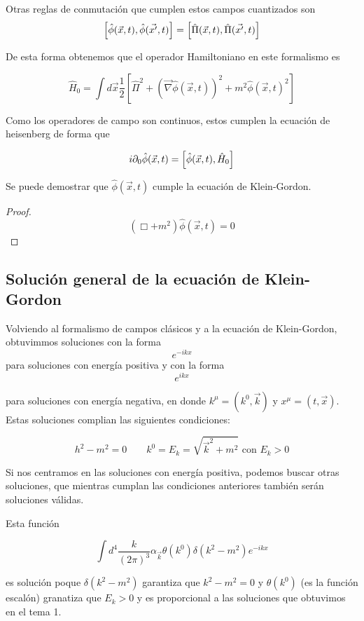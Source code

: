 Otras reglas de conmutación que cumplen estos campos cuantizados son 
\[\comm{\hat{\phi}(\vec{x},t)}{\hat{\phi}(\vec{x'},t)}=\comm{\hat{\Pi}(\vec{x},t)}{\hat{\Pi}(\vec{x'},t)}\]

De esta forma obtenemos que el operador Hamiltoniano en este formalismo es 

\[\hat{H}_{0}=\int d \vec{x}\frac{1}{2}\left[\hat{\Pi}^{2}+(\vec{\nabla}\hat{\phi}(\vec{x},t))^{2}+m^{2}\hat{\phi}(\vec{x},t)^{2}\right]\]

Como los operadores de campo son continuos, estos cumplen la ecuación de heisenberg de forma que 

\[i\partial_{0}\hat{\phi}(\vec{x},t)=\comm{\hat{\phi}(\vec{x},t)}{\hat{H}_{0}}\]


Se puede demostrar que $\hat{\phi}(\vec{x},t)$ cumple la ecuación de Klein-Gordon.

\begin{proof}
  \[(\Box + m^{2})\hat{\phi}(\vec{x},t)=0\]
\end{proof}

\subsection{Solución general de la ecuación de Klein-Gordon}

Volviendo al formalismo de campos clásicos y a la ecuación de Klein-Gordon, obtuvimmos soluciones con la forma 
\[e^{-ikx}\]
para soluciones con energía positiva y con la forma
\[e^{ikx}\]

para soluciones con energía negativa, en donde $k^{\mu}=(k^{0},\vec{k})$ y $x^{\mu}=(t,\vec{x})$. Estas soluciones complian las siguientes condiciones:

\[h^{2}-m^{2}=0 \qquad k^{0}=E_{k}=\sqrt{\vec{k}^{2}+m^{2}}\text{ con }E_{k}>0\]

Si nos centramos en las soluciones con energía positiva, podemos buscar otras soluciones, que mientras cumplan las condiciones anteriores también serán soluciones válidas. 

Esta función 

\[\int d^{4}\frac{k}{(2\pi)^{3}}\alpha_{\vec{k}}\theta(k^{0})\delta(k^{2}-m^{2})e^{-ikx}\]

es solución poque $\delta(k^{2}-m^{2})$ garantiza que $k^{2}-m^{2}=0$ y $\theta(k^{0})$ (es la función escalón) granatiza que $E_{k}>0$ y es proporcional a las soluciones que obtuvimos en el tema 1. 

